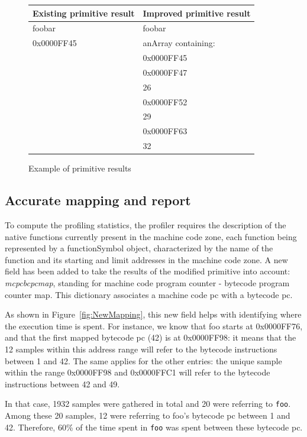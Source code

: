 \documentclass[10pt,preprint,nonatbib]{sigplanconf}
\newcommand{\ct}{\lstinline[backgroundcolor=\color{white},basicstyle=\small\ttfamily]}
\newcommand{\figref}[1]{Figure~\ref{fig:#1}}
\begin{document}
\begin{figure}
    \begin{center}
		\noindent \begin{tabular}{l | l}
		Existing primitive result & Improved primitive result \\		
		\midrule
		foobar & foobar \\
		0x0000FF45 & anArray containing: \\
		& 0x0000FF45 \\
		& 0x0000FF47 \\
		& 26 \\
		& 0x0000FF52 \\
		& 29 \\
		& 0x0000FF63 \\
		& 32 \\
		\end{tabular}
	\caption{Example of primitive results\label{fig:Primitive}}
    \end{center}
\end{figure}

\subsection{Accurate mapping and report}

To compute the profiling statistics, the profiler requires the description of the native functions currently present in the machine code zone, each function being represented by a functionSymbol object, characterized by the name of the function and its starting and limit addresses in the machine code zone.
A new field has been added to take the results of the modified primitive into account: \textit{mcpcbcpcmap}, standing for machine code program counter - bytecode program counter map. This dictionary associates a machine code pc with a bytecode pc.

As shown in \figref{NewMapping}, this new field helps with identifying where the execution time is spent. For instance, we know that foo starts at 0x0000FF76, and that the first mapped bytecode pc (42) is at 0x0000FF98: it means that the 12 samples within this address range will refer to the bytecode instructions between 1 and 42.
The same applies for the other entries: the unique sample within the range 0x0000FF98 and 0x0000FFC1 will refer to the bytecode instructions between 42 and 49. 

In that case, 1932 samples were gathered in total and 20 were referring to \ct{foo}. Among these 20 samples, 12 were referring to foo's bytecode pc between 1 and 42. Therefore, 60\% of the time spent in \ct{foo} was spent between these bytecode pc.
\end{document}
